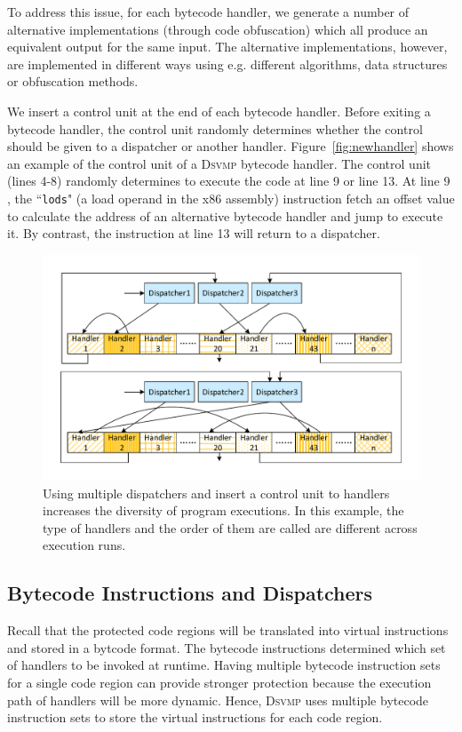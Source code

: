 \documentclass[preprint,12pt,3p]{elsarticle}
\newcommand{\DSVMP}{\textsc{Dsvmp}\xspace}
\begin{document}
To address this issue, for each bytecode handler, we generate a number of alternative implementations (through code obfuscation) which all
produce an equivalent output for the same input. The alternative implementations, however,
are implemented in different ways using e.g. different algorithms, data structures or obfuscation methods.

We insert a control unit at the end of each bytecode handler. Before exiting a bytecode handler,
the control unit randomly determines whether the control should be given to a dispatcher or
another handler. Figure~\ref{fig:newhandler} shows an example of the control unit of a \DSVMP bytecode handler.
The control unit (lines 4-8) randomly determines to execute the code at line 9 or line 13.
At line 9 , the ``\texttt{lods}" (a load operand in the x86 assembly) instruction fetch an offset value
to calculate the address of an alternative bytecode handler and jump to execute it.
By contrast, the instruction at line 13 will return to a dispatcher.

\begin{figure}[!t]
  \centering
  \includegraphics[width=0.65\columnwidth]{figure/figdh.pdf}
  \caption{Using multiple dispatchers and insert a control unit to handlers increases the diversity of program executions. In this example, the type of handlers and the order of them are called are different across execution runs. }\label{fig:Fig.dh}
\end{figure}

\subsection{Bytecode Instructions and Dispatchers}\label{sec:mbd}
Recall that the protected code regions will be translated into virtual
instructions and stored in a bytcode format. The bytecode instructions
determined which set of handlers to be invoked at runtime.  Having multiple
bytecode instruction sets for a single code region can provide stronger protection
because the execution path of handlers will be more dynamic. Hence, \DSVMP
uses multiple bytecode instruction sets to store the virtual instructions for each
code region.
\end{document}
